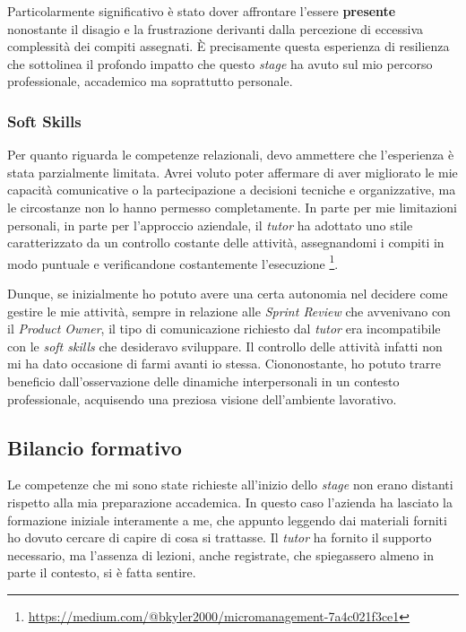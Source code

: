    \vspace{0.2 em}
    \noindent Particolarmente significativo è stato dover affrontare l'essere \textbf{presente} nonostante il disagio e la frustrazione derivanti dalla percezione di eccessiva complessità dei compiti assegnati. È precisamente questa esperienza di resilienza che sottolinea il profondo impatto che questo \textit{stage} ha avuto sul mio percorso professionale, accademico ma soprattutto personale. 

    \subsubsection{Soft Skills}
    Per quanto riguarda le competenze relazionali, devo ammettere che l'esperienza è stata parzialmente limitata. Avrei voluto poter affermare di aver migliorato le mie capacità comunicative o la partecipazione a decisioni tecniche e organizzative, ma le circostanze non lo hanno permesso completamente. In parte per mie limitazioni personali, in parte per l'approccio aziendale, il \textit{tutor} ha adottato uno stile caratterizzato da un controllo costante delle attività, assegnandomi i compiti in modo puntuale e verificandone costantemente l'esecuzione \footnote{\href{https://medium.com/@bkyler2000/micromanagement-7a4c021f3ce1}{https://medium.com/@bkyler2000/micromanagement-7a4c021f3ce1}}. 

    \vspace{0.2 em}
    \noindent Dunque, se inizialmente ho potuto avere una certa autonomia nel decidere come gestire le mie attività, sempre in relazione alle \textit{Sprint Review} che avvenivano con il \textit{Product Owner}, il tipo di comunicazione richiesto dal \textit{tutor} era incompatibile con le \textit{soft skills} che desideravo sviluppare. Il controllo delle attività infatti non mi ha dato occasione di farmi avanti io stessa. Ciononostante, ho potuto trarre beneficio dall'osservazione delle dinamiche interpersonali in un contesto professionale, acquisendo una preziosa visione dell'ambiente lavorativo.
     
    \subsection{Bilancio formativo}
    Le competenze che mi sono state richieste all'inizio dello \textit{stage} non erano distanti rispetto alla mia preparazione accademica. In questo caso l'azienda ha lasciato la formazione iniziale interamente a me, che appunto leggendo dai materiali forniti ho dovuto cercare di capire di cosa si trattasse. Il \textit{tutor} ha fornito il supporto necessario, ma l'assenza di lezioni, anche registrate, che spiegassero almeno in parte il contesto, si è fatta sentire. 

